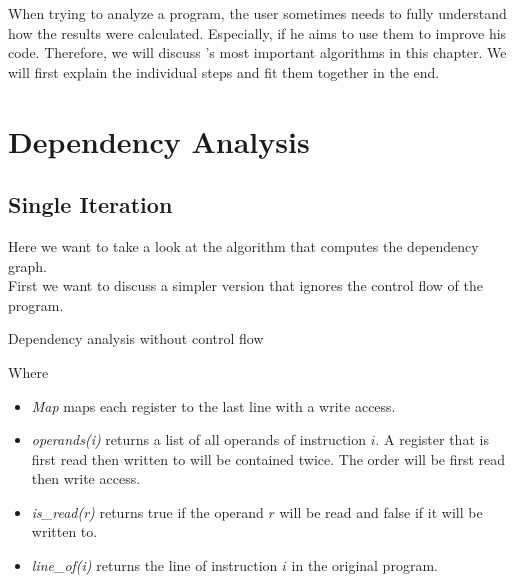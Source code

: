 When trying to analyze a program, the user sometimes needs to fully understand how the results were calculated. Especially, if he aims to use them to improve his code. Therefore, we will discuss \suaca's most important algorithms in this chapter. We will first explain the individual steps and fit them together in the end.

\section{Dependency Analysis}
\label{sec:depanalysis}

\subsection{Single Iteration}

Here we want to take a look at the algorithm that computes the dependency graph. \\
First we want to discuss a simpler version that ignores the control flow of the program.

\begin{algorithm}[H]
    \SetAlgoLined
    \caption{Dependency analysis without control flow}
    \label{alg:depsingle}
\end{algorithm}

\newpage

Where
\begin{itemize}
    \item \emph{Map} maps each register to the last line with a write access.
    \item \emph{operands(i)} returns a list of all operands of instruction $i$. A register that is first read then written to will be contained twice. The order will be first read then write access.
    \item \emph{is\_read(r)} returns true if the operand $r$ will be read and false if it will be written to.
    \item \emph{line\_of(i)} returns the line of instruction $i$ in the original program.
\end{itemize}

